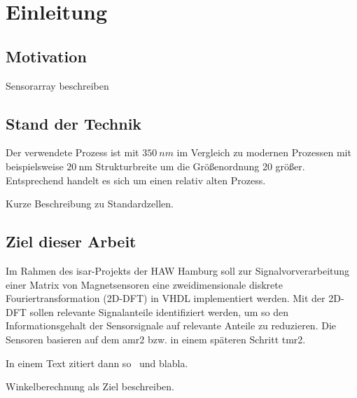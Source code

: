 \chapter{Einleitung}
 \section{Motivation}
Sensorarray beschreiben

\section{Stand der Technik}
Der verwendete Prozess ist mit $\SI{350}{nm}$ im Vergleich zu modernen Prozessen mit beispielsweise $\SI{20}{\nm}$ Strukturbreite um die Größenordnung 20 größer. Entsprechend handelt es 
sich um einen relativ alten Prozess.

Kurze Beschreibung zu Standardzellen.


\section{Ziel dieser Arbeit}
Im Rahmen des \gls{isar}-Projekts der HAW Hamburg soll zur Signalvorverarbeitung einer Matrix von Magnetsensoren  eine 
zweidimensionale diskrete Fouriertransformation (2D-DFT) in VHDL implementiert werden. Mit der 
2D-DFT sollen relevante Signalanteile identifiziert werden, um so den Informationsgehalt der Sensorsignale auf relevante Anteile zu reduzieren. Die Sensoren basieren auf 
dem \gls{amr2} bzw. in einem späteren Schritt \gls{tmr2}.

In einem Text zitiert dann so~\autocite[10-20]{krey2015systemarchitektur} und blabla.

Winkelberechnung als Ziel beschreiben.